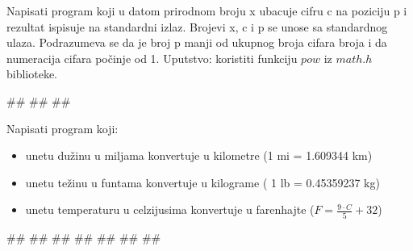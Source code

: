 \begin{Exercise}[label=p1_09] 
Napisati program koji u datom prirodnom broju x ubacuje cifru c
na poziciju p i rezultat ispisuje na standardni izlaz. Brojevi x, c i p se unose sa standardnog ulaza. Podrazumeva se da je broj p manji od ukupnog broja cifara broja i da numeracija cifara počinje od 1. Uputstvo: koristiti funkciju $pow$ iz $math.h$ biblioteke.\\
\begin{miditest}
\begin{upotreba}{1}
#\naslovInt#
##
##
\end{upotreba}
\end{miditest}
\end{Exercise}
\begin{Answer}[ref=p1_09]
\end{Answer}


\begin{Exercise}[label=p1_10] 
Napisati program koji:
\begin{itemize}
\item unetu dužinu u miljama konvertuje u kilometre (1 mi = 1.609344 km)
\item unetu težinu u funtama konvertuje u kilograme ( 1 lb = 0.45359237 kg)
\item unetu temperaturu u celzijusima konvertuje u farenhajte ($F=\frac{9\cdot C}{5}+32$)
\end{itemize}

\begin{maxitest}
\begin{upotreba}{1}
#\naslovInt#
##
##
##
##
##
##
\end{upotreba}
\end{maxitest}
\end{Exercise}
\begin{Answer}[ref=p1_10]
\end{Answer}

